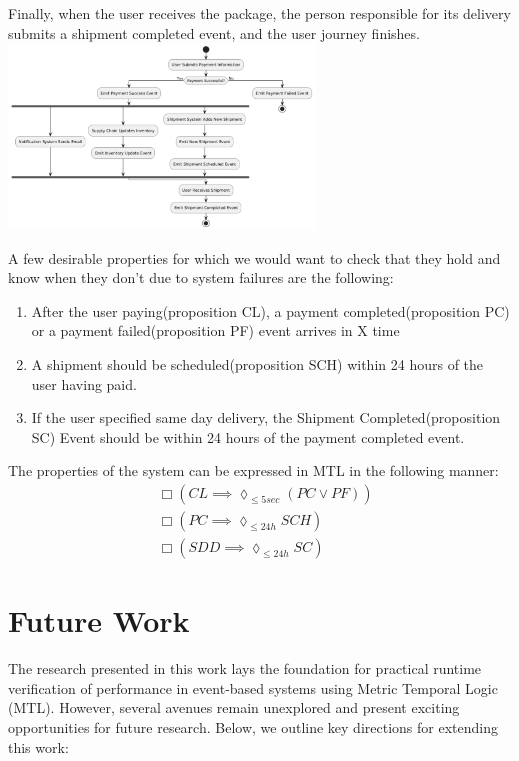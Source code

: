 \documentclass[twocolumn]{article}
\begin{document}
Finally, when the user receives the package, the person responsible for its delivery submits a shipment completed event,
and the user journey finishes.
\includegraphics[width=3.2in]{events-diagram.pdf}

A few desirable properties for which we would want to check that they hold and know when they don't due to
system failures are the following:
\begin{enumerate}
	\item After the user paying(proposition CL), a payment completed(proposition PC) or a payment failed(proposition PF) event arrives in X time
	\item A shipment should be scheduled(proposition SCH) within 24 hours of the user having paid.
	\item If the user specified same day delivery, the Shipment Completed(proposition SC) Event should be within 24 hours of the payment completed event.
\end{enumerate}
The properties of the system can be expressed in MTL in the following manner:
\begin{align}
	 & \Box (CL \implies \lozenge_{\leq 5sec}( PC \lor PF)) \\
	 & \Box (PC \implies \lozenge_{\leq 24h} SCH)           \\
	 & \Box (SDD \implies \lozenge_{\leq 24h} SC )
\end{align}


\section{Future Work}
The research presented in this work lays the foundation for practical runtime verification of performance in event-based systems using Metric Temporal Logic (MTL). However, several avenues remain unexplored and present exciting opportunities for future research. Below, we outline key directions for extending this work:
\end{document}
